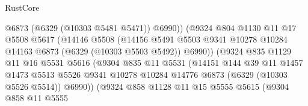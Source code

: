 \begin{lexlean}{RustCore}
\begin{coremodule}
                                    @6873
                                    (@6329 (@10303 @5481 @5471))
                                    @6990))
                                (@9324
                                  @804
                                  @1130
                                  @11
                                  @17
                                  @5508
                                  @5617
                                  (@14146
                                    @5508
                                    (@14156
                                      @5491
                                      @5503
                                      @9341
                                      @10278
                                      @10284
                                      @14163
                                      @6873
                                      (@6329 (@10303 @5503 @5492))
                                      @6990))
                                  (@9324
                                    @835
                                    @1129
                                    @11
                                    @16
                                    @5531
                                    @5616
                                    (@9304
                                      @835
                                      @11
                                      @5531
                                      (@14151
                                        @144
                                        @39
                                        @11
                                        @1457
                                        @1473
                                        @5513
                                        @5526
                                        @9341
                                        @10278
                                        @10284
                                        @14776
                                        @6873
                                        (@6329 (@10303 @5526 @5514))
                                        @6990))
                                    (@9324
                                      @858
                                      @1128
                                      @11
                                      @15
                                      @5555
                                      @5615
                                      (@9304
                                        @858
                                        @11
                                        @5555

\end{coremodule}
\end{lexlean}
